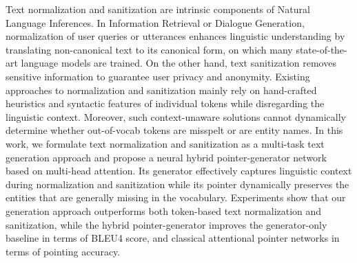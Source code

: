 Text normalization and sanitization are intrinsic components of Natural Language Inferences. In Information Retrieval or Dialogue Generation, normalization of user queries or utterances enhances linguistic understanding by translating non-canonical text to its canonical form, on which many state-of-the-art language models are trained. On the other hand, text sanitization removes sensitive information to guarantee user privacy and anonymity. Existing approaches to normalization and sanitization mainly rely on hand-crafted heuristics and syntactic features of individual tokens while disregarding the linguistic context. Moreover, such context-unaware solutions cannot dynamically determine whether out-of-vocab tokens are misspelt or are entity names. In this work, we formulate text normalization and sanitization as a multi-task text generation approach and propose a neural hybrid pointer-generator network based on multi-head attention. Its generator effectively captures linguistic context during normalization and sanitization while its pointer dynamically preserves the entities that are generally missing in the vocabulary. Experiments show that our generation approach outperforms both token-based text normalization and sanitization, while the hybrid pointer-generator improves the generator-only baseline in terms of BLEU4 score, and classical attentional pointer networks in terms of pointing accuracy.
